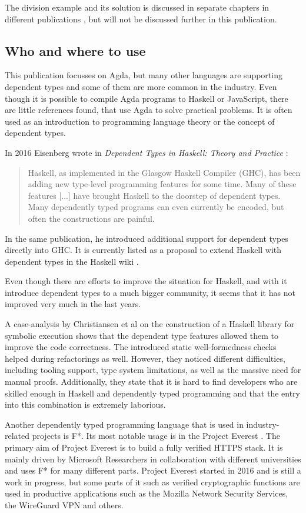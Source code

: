 The division example and its solution is discussed in separate chapters in different publications \cite{10.1145/2841316, Bove2009}, but will not be discussed further in this publication.

\subsection{Who and where to use}
This publication focusses on Agda, but many other languages are supporting dependent types and some of them are more common in the industry.
Even though it is possible to compile Agda programs to Haskell or JavaScript, there are little references found, that use Agda to solve practical problems.
It is often used as an introduction to programming language theory or the concept of dependent types.

In 2016 Eisenberg wrote in \emph{Dependent Types in Haskell: Theory and Practice} \cite{DBLP:journals/corr/Eisenberg16}: 
\begin{quote}
Haskell, as implemented in the Glasgow Haskell Compiler (GHC), has been adding new type-level programming features for some time. Many of these features [...] have brought Haskell to the doorstep of dependent types. Many dependently typed programs can even currently be encoded, but often the constructions are painful.
\end{quote}

In the same publication, he introduced additional support for dependent types directly into GHC. It is currently listed as a proposal to extend Haskell with dependent types in the Haskell wiki \cite{haskell_wiki}.

Even though there are efforts to improve the situation for Haskell, and with it introduce dependent types to a much bigger community, it seems that it has not improved very much in the last years.

A case-analysis by Christiansen et al \cite{10.1145/3341704} on the construction of a Haskell library for symbolic execution shows that the dependent type features allowed them to improve the code correctness. 
The introduced static well-formedness checks helped during refactorings as well. 
However, they noticed different difficulties, including tooling support, type system limitations, as well as the massive need for manual proofs. 
Additionally, they state that it is hard to find developers who are skilled enough in Haskell and dependently typed programming and that the entry into this combination is extremely laborious.

Another dependently typed programming language that is used in industry-related projects is F*. 
Its most notable usage is in the Project Everest \cite{project_everest_github_io}. The primary aim of Project Everest is to build a fully verified HTTPS stack.
It is mainly driven by Microsoft Researchers in collaboration with different universities and uses F* for many different parts.
Project Everest started in 2016 and is still a work in progress, but some parts of it such as verified cryptographic functions are used in productive applications such as the Mozilla Network Security Services\cite{project_everest_slides}, the WireGuard VPN and others.

